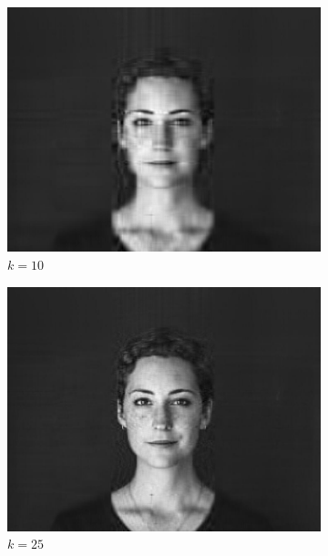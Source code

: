 \documentclass[11pt,a4paper]{article}
\begin{document}
\begin{figure}[H]
\begin{subfigure}[t]{.5\textwidth}
    \includegraphics[scale=0.15]{img/k10_woman}
    \caption{$k = 10$}
  \end{subfigure}%
  \begin{subfigure}[t]{.5\textwidth}
    \centering
    \includegraphics[scale=0.15]{img/k25_woman}
    \caption{$k = 25$}
  \end{subfigure}
  \begin{subfigure}[t]{.5\textwidth}
    \centering

\end{subfigure}
\end{figure}
\end{document}
